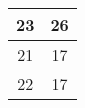 \begin{table}[H]
\begin{tabular}{cc}
\multicolumn{1}{|c|}{23}                                                        & \multicolumn{1}{c|}{26}                                                             \\ \hline
\multicolumn{1}{|c|}{21}                                                        & \multicolumn{1}{c|}{17}                                                             \\ \hline
\multicolumn{1}{|c|}{22}                                                        & \multicolumn{1}{c|}{17}                                                             \\ \hline
\end{tabular}\end{table}